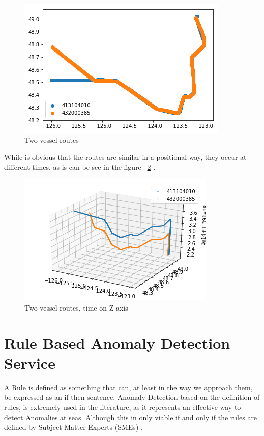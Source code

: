 \begin{figure}[H]
	\centering
	\includegraphics[scale = .8]{figures/VesselRendevouz2d}
    \caption{Two vessel routes}
    \label{fig: VesselRendevouz2d}
\end{figure}

While is obvious that the routes are similar in a positional way, they occur at different times, as is can be see in the figure ~\ref{fig: VesselRendevouz3d} .

\begin{figure}[H]
	\centering
	\includegraphics[scale = .9]{figures/VesselRendevouz3d}
    \caption{Two vessel routes, time on Z-axis}
    \label{fig: VesselRendevouz3d}
\end{figure}


\section{Rule Based Anomaly Detection Service}
\label{section: 4 Rule Based Anomaly Detection}
A Rule is defined as something that can, at least in the way we approach them, be expressed as an if-then sentence, \cite{Edlund2006RuleSea-Surveillance}
Anomaly Detection based on the definition of rules, is extremely used in the literature, as it represents an effective way to detect Anomalies at seas. Although this in only viable if and only if the rules are defined by Subject Matter Experts (SMEs) \cite{Boinepalli2014AAlgorithm, Will2011FastProcesses}.

